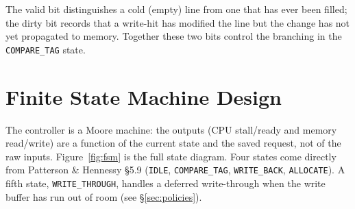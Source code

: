 \documentclass[11pt,a4paper]{article}
\begin{document}
The valid bit distinguishes a cold (empty) line from one that has ever been
filled; the dirty bit records that a write-hit has modified the line but the
change has not yet propagated to memory. Together these two bits control the
branching in the \texttt{COMPARE\_TAG} state.

\section{Finite State Machine Design}\label{sec:fsm}

The controller is a Moore machine: the outputs (CPU stall/ready and memory
read/write) are a function of the current state and the saved request, not of
the raw inputs. Figure~\ref{fig:fsm} is the full state diagram. Four states
come directly from Patterson \& Hennessy \S5.9 (\texttt{IDLE},
\texttt{COMPARE\_TAG}, \texttt{WRITE\_BACK}, \texttt{ALLOCATE}). A fifth
state, \texttt{WRITE\_THROUGH}, handles a deferred write-through when the
write buffer has run out of room (see \S\ref{sec:policies}).
\end{document}
